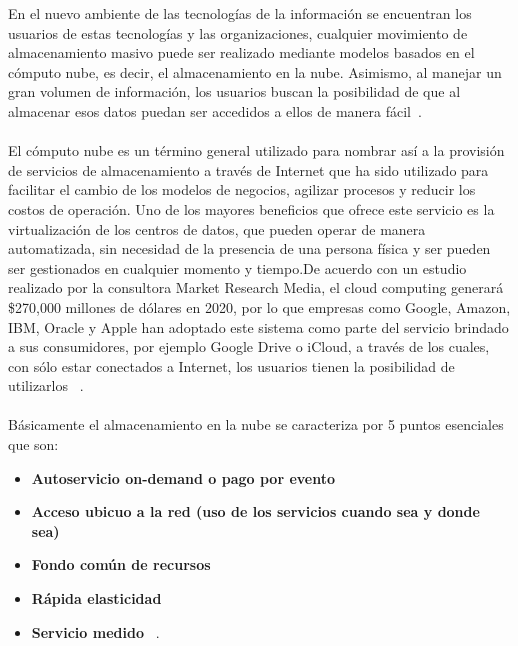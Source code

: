 En el nuevo ambiente de las tecnologías de la información se encuentran los usuarios de estas tecnologías y las organizaciones, cualquier movimiento de almacenamiento masivo puede ser realizado mediante  modelos basados en el cómputo nube, es decir, el almacenamiento en la nube. Asimismo, al manejar un gran volumen de información, los usuarios buscan la posibilidad de que al almacenar esos datos puedan ser accedidos a ellos de manera fácil~\cite{Nubei}. \\ \\ 
El cómputo nube es un término general utilizado para nombrar así a la provisión de servicios de almacenamiento a través de Internet que ha sido utilizado para facilitar el cambio de los modelos de negocios, agilizar procesos y reducir los costos de operación. Uno de los mayores beneficios que ofrece este servicio es la virtualización de los centros de datos, que pueden operar de manera automatizada, sin  necesidad de la presencia de una persona física y ser pueden ser gestionados en cualquier momento y tiempo.De acuerdo con un estudio realizado por la consultora Market Research Media, el cloud computing generará \$270,000 millones de dólares en 2020, por lo que empresas como Google, Amazon, IBM, Oracle y Apple han adoptado este sistema como parte del servicio brindado a sus consumidores, por ejemplo Google Drive o iCloud, a través de los cuales, con sólo estar conectados a Internet, los usuarios tienen la posibilidad de utilizarlos ~\cite{Nubecomp}. \\ \\ Básicamente el almacenamiento en la nube se caracteriza por 5 puntos esenciales que son: 
	\begin{itemize}
		\item \textbf{Autoservicio on-demand o pago por evento}  
		\item \textbf{Acceso ubicuo a la red (uso de los servicios cuando sea y donde sea)}  
		\item \textbf{Fondo común de recursos} 
		\item \textbf{Rápida elasticidad} 
 		\item \textbf{Servicio medido}  ~\cite{Compnube}.
 \end{itemize}

